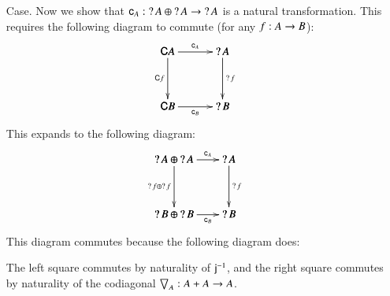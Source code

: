 \begin{itemize}
\begin{itemize}
    \end{itemize}

  \item[Case.] Now we show that $\c{A} : \wn A \oplus \wn A \mto \wn
    A$ is a natural transformation.  This requires the following
    diagram to commute (for any $f : A \mto B$):
    \[
    \bfig
    \square[
      \func{C}A`
      \wn A`
      \func{C}B`
      \wn B;
      \c{A}`
      \func{C}f`
      \wn f`
      \c{B}]
    \efig
    \]
    This expands to the following diagram:
    \[
    \bfig
    \square[
      \wn A \oplus \wn A`
      \wn A`
      \wn B \oplus \wn B`
      \wn B;
      \c{A}`
      \wn f \oplus \wn f`
      \wn f`
      \c{B}]
    \efig
    \]
    This diagram commutes because the following diagram does:
    \begin{diagram}
    \end{diagram}
    The left square commutes by naturality of $\jinv{}$, and the right square commutes by naturality of the codiagonal
    $\bigtriangledown_{A} : A + A \mto A$.


\end{itemize}
